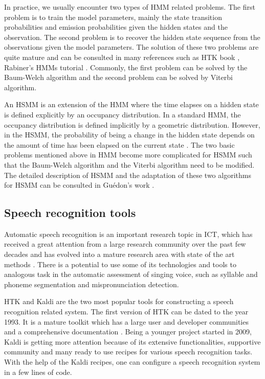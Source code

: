 In practice, we usually encounter two types of \gls{HMM} related problems. The first problem is to train the model parameters, mainly the state transition probabilities and emission probabilities given the hidden states and the observation. The second problem is to recover the hidden state sequence from the observations given the model parameters. The solution of these two problems are quite mature and can be consulted in many references such as \gls{HTK} book \cite{Young2006HTK}, Rabiner's \gls{HMM}s tutorial \cite{rabiner1989tutorial}. Commonly, the first problem can be solved by the Baum-Welch algorithm and the second problem can be solved by Viterbi algorithm.

An \gls{HSMM} is an extension of the \gls{HMM} where the time elapses on a hidden state is defined explicitly by an occupancy distribution. In a standard \gls{HMM}, the occupancy distribution is defined implicitly by a geometric distribution. However, in the \gls{HSMM}, the probability of being a change in the hidden state depends on the amount of time has been elapsed on the current state \cite{Wikipedia}. The two basic problems mentioned above in \gls{HMM} become more complicated for \gls{HSMM} such that the Baum-Welch algorithm and the Viterbi algorithm need to be modified. The detailed description of \gls{HSMM} and the adaptation of these two algorithms for \gls{HSMM} can be consulted in Guédon's work \cite{GUEDON20072379}.

\subsection{Speech recognition tools}\label{sec:ch2:speech_tools}

Automatic speech recognition is an important research topic in \gls{ICT}, which has received a great attention from a large research community over the past few decades and has evolved into a mature research area with state of the art methods \cite{an-overview-of-modern-speech-recognition}. There is a potential to use some of its technologies and tools to analogous task in the automatic assessment of singing voice, such as syllable and phoneme segmentation and mispronunciation detection.

\gls{HTK} \cite{HTKteam} and Kaldi \cite{Povey2011ASRU} are the two most popular tools for constructing a speech recognition related system. The first version of \gls{HTK} can be dated to the year 1993. It is a mature toolkit which has a large user and developer communities and a comprehensive documentation \cite{Young2006HTK}. Being a younger project started in 2009, Kaldi is getting more attention because of its extensive functionalities, supportive community and many ready to use recipes for various speech recognition tasks. With the help of the Kaldi recipes, one can configure a speech recognition system in a few lines of code.

